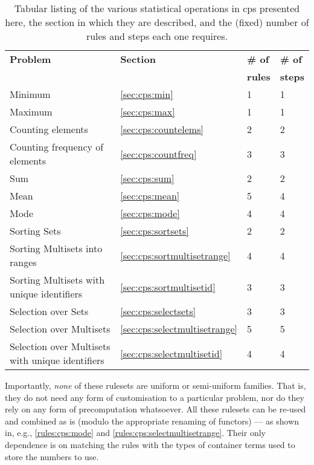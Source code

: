 \begin{table} \centering
   \begin{tabular}{|l|l|l|l|}
    \hline
    \textbf{Problem} & \textbf{Section} & \textbf{\# of} & \textbf{\# of}\\&& \textbf{rules} & \textbf{steps}\\ \hline
    Minimum & \ref{sec:cps:min} & 1 & 1 \\ %
    Maximum & \ref{sec:cps:max} & 1 & 1 \\ \hline
    Counting elements & \ref{sec:cps:countelems} & 2 & 2 \\ %
    Counting frequency of elements & \ref{sec:cps:countfreq} & 3 & 3 \\ \hline
    Sum & \ref{sec:cps:sum} & 2 & 2 \\ %
    Mean & \ref{sec:cps:mean} & 5 & 4 \\ %
    Mode & \ref{sec:cps:mode} & 4 & 4 \\ \hline
    Sorting Sets & \ref{sec:cps:sortsets} & 2 & 2 \\ %
    Sorting Multisets into ranges & \ref{sec:cps:sortmultisetrange} & 4 & 4 \\ %
    Sorting Multisets with unique identifiers & \ref{sec:cps:sortmultisetid} & 3 & 3 \\ \hline
    Selection over Sets & \ref{sec:cps:selectsets} & 3 & 3 \\ %
    Selection over Multisets & \ref{sec:cps:selectmultisetrange} & 5 & 5 \\ %
    Selection over Multisets with unique identifiers & \ref{sec:cps:selectmultisetid} & 4 & 4 \\ \hline
\end{tabular} 
\caption[Listing of various statistical operations in \gls{cps}]{\label{tab:cps:summary}Tabular listing of the various statistical operations in \gls{cps} presented here, the section in which they are described, and the (fixed) number of rules and steps each one requires.}
\end{table}

Importantly, \emph{none} of these \glspl{ruleset} are uniform or semi-uniform families.  That is, they do not need any form of customisation to a particular problem, nor do they rely on any form of precomputation whatsoever.  All these \glspl{ruleset} can be re-used and combined as is (modulo the appropriate renaming of functors) --- as shown in, e.g., \cref{rules:cps:mode} and \cref{rules:cps:selectmultisetrange}.  Their only dependence is on matching the rules with the types of container terms used to store the numbers to use.

